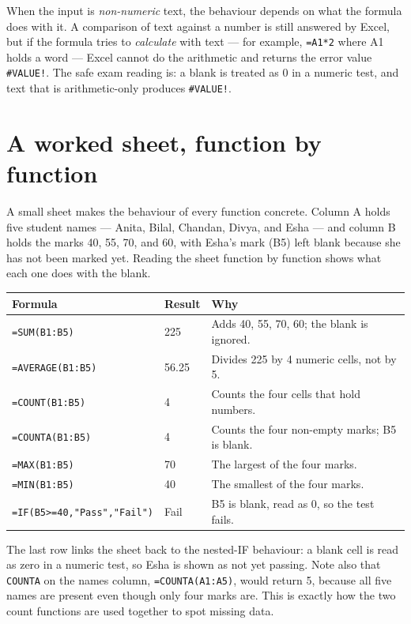 \documentclass[11pt]{article}
\begin{document}
When the input is \emph{non-numeric} text, the behaviour depends on what the
formula does with it. A comparison of text against a number is still answered
by Excel, but if the formula tries to \emph{calculate} with text --- for
example, \texttt{=A1*2} where A1 holds a word --- Excel cannot do the
arithmetic and returns the error value \texttt{\#VALUE!}. The safe exam
reading is: a blank is treated as 0 in a numeric test, and text that is
arithmetic-only produces \texttt{\#VALUE!}.

\section{A worked sheet, function by function}
A small sheet makes the behaviour of every function concrete. Column A holds
five student names --- Anita, Bilal, Chandan, Divya, and Esha --- and column B
holds the marks 40, 55, 70, and 60, with Esha's mark (B5) left blank because
she has not been marked yet. Reading the sheet function by function shows what
each one does with the blank.

\begin{center}
\begin{tabular}{p{}p{}p{}}
\toprule
\textbf{Formula} & \textbf{Result} & \textbf{Why} \\
\midrule
\texttt{=SUM(B1:B5)} & 225 & Adds 40, 55, 70, 60; the blank is ignored. \\
\texttt{=AVERAGE(B1:B5)} & 56.25 & Divides 225 by 4 numeric cells, not by 5. \\
\texttt{=COUNT(B1:B5)} & 4 & Counts the four cells that hold numbers. \\
\texttt{=COUNTA(B1:B5)} & 4 & Counts the four non-empty marks; B5 is blank. \\
\texttt{=MAX(B1:B5)} & 70 & The largest of the four marks. \\
\texttt{=MIN(B1:B5)} & 40 & The smallest of the four marks. \\
\texttt{=IF(B5>=40,"Pass","Fail")} & Fail & B5 is blank, read as 0, so the test fails. \\
\bottomrule
\end{tabular}
\end{center}

The last row links the sheet back to the nested-IF behaviour: a blank cell is
read as zero in a numeric test, so Esha is shown as not yet passing. Note also
that \texttt{COUNTA} on the names column, \texttt{=COUNTA(A1:A5)}, would
return 5, because all five names are present even though only four marks are.
This is exactly how the two count functions are used together to spot missing
data.
\end{document}
